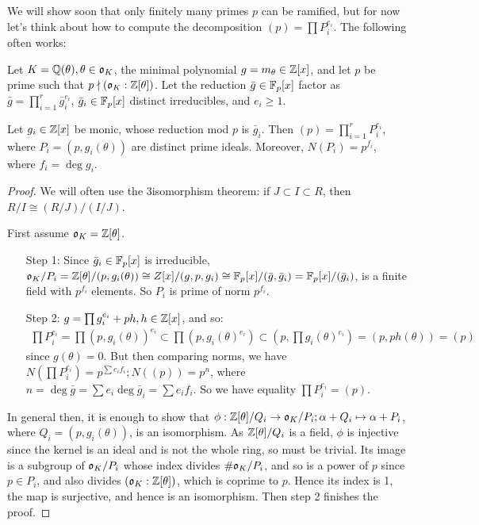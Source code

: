 \documentclass[10pt,a4paper]{article}
\begin{document}
We will show soon that only finitely many primes $p$ can be ramified, but for now let's think about how to compute the decomposition $(p) = \prod P_i^{e_i}$. The following often works:
\begin{theorem}
Let $K = \mathbb{Q}(\theta), \theta \in \mathfrak{o}_K$, the minimal polynomial $g = m_{\theta} \in \mathbb{Z}[x]$, and let $p$ be prime such that $p \nmid (\mathfrak{o}_K : \mathbb{Z}[\theta])$. Let the reduction $\bar{g} \in \mathbb{F}_p[x]$ factor as $\bar{g} = \prod_{i=1}^r \bar{g}_i^{e_i}$, $\bar{g}_i \in \mathbb{F}_p[x]$ distinct irreducibles, and $e_i \geq 1$.

Let $g_i \in \mathbb{Z}[x]$ be monic, whose reduction mod $p$ is $\bar{g}_i$. Then $(p) = \prod_{i=1}^r P_i^{e_i}$, where $P_i = (p, g_i(\theta))$ are distinct prime ideals. Moreover, $N(P_i) = p^{f_i}$, where $f_i = \deg g_i$.
\end{theorem}
\begin{proof}
We will often use the 3\th[rd] isomorphism theorem: if $J \subset I \subset R$, then $R/I  \cong (R/J)/(I/J)$.

First assume $\mathfrak{o}_K = \mathbb{Z}[\theta]$.
\begin{itemize}
\item[Step 1:]  Since $\bar{g}_i \in \mathbb{F}_p[x]$ is irreducible, $\mathfrak{o}_K/P_i = \mathbb{Z}[\theta]/(p, g_i(\theta)) \cong Z[x]/(g, p, g_i) \cong \mathbb{F}_p[x]/(\bar{g}, \bar{g}_i) = \mathbb{F}_p[x]/(\bar{g}_i)$, is a finite field with $p^{f_i}$ elements. So $P_i$ is prime of norm $p^{f_i}$.

\item[Step 2:] $g = \prod g_i^{e_i} +ph, h \in \mathbb{Z}[x]$, and so:
\begin{align*}
\prod P_i^{e_i} = \prod (p, g_i(\theta))^{e_i} \subset \prod(p, g_i(\theta)^{e_i}) \subset (p, \prod g_i(\theta)^{e_i}) = (p, ph(\theta)) = (p)
\end{align*}
since $g(\theta) = 0$. But then comparing norms, we have $N(\prod P_i^{e_i}) = p^{\sum e_if_i}; N((p))=p^n$, where $n = \deg \bar{g} = \sum e_i \deg \bar{g}_i = \sum e_i f_i$. So we have equality $\prod P_i^{e_i} = (p)$.
\end{itemize}

In general then, it is enough to show that $\phi:\mathbb{Z}[\theta]/Q_i \to \mathfrak{o}_K/P_i; \alpha + Q_i \mapsto \alpha + P_i$, where $Q_i = (p, g_i(\theta))$, is an isomorphism. As $\mathbb{Z}[\theta]/Q_i$ is a field, $\phi$ is injective since the kernel is an ideal and is not the whole ring, so must be trivial. Its image is a subgroup of $\mathfrak{o}_K/P_i$ whose index divides $\#\mathfrak{o}_K/P_i$, and so is a power of $p$ since $p \in P_i$, and also divides $(\mathfrak{o}_K:\mathbb{Z}[\theta])$, which is coprime to $p$. Hence its index is 1, the map is surjective, and hence is an isomorphism. Then step 2 finishes the proof.
\end{proof}
\end{document}
